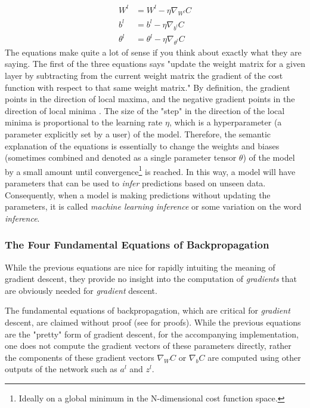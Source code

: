 \documentclass{article}
\begin{document}
\begin{align}
	W^{l}      & = W^{l} - \eta \nabla_{W^{l}}C           \\
	b^{l}      & = b^{l} - \eta \nabla_{b^{l}}C           \\
	\theta^{l} & = \theta^{l} - \eta \nabla_{\theta^{l}}C
\end{align}
The equations make quite a lot of sense if you think about exactly
what they are saying. The first of the three equations says "update the
weight matrix for a given layer by subtracting from the current weight matrix
the gradient of the cost function with respect to that same weight matrix." By definition,
the gradient points in the direction of local maxima, and the
negative gradient points in the direction of local minima \cite{MathLibreGradient2021}.
The size of the "step" in the direction of the local minima
is proportional to the learning rate $\eta$,
which is a hyperparameter (a parameter explicitly set by a user) of the model.
Therefore, the semantic explanation of the equations is essentially to change the
weights and biases (sometimes combined and denoted as a single parameter tensor $\theta$)
of the model by a small amount until convergence\footnote{Ideally
	on a global minimum in the N-dimensional cost function space.} is reached. In this way, a model
will have parameters that can be used to \textit{infer} predictions based on
unseen data. Consequently, when a model is making predictions without
updating the parameters, it is called \textit{machine learning inference} or
some variation on the word \textit{inference}.

\subsubsection{The Four Fundamental Equations of Backpropagation}

While the previous equations are nice for rapidly intuiting the meaning of
gradient descent, they provide no insight into the computation of \textit{gradients}
that are obviously needed for \textit{gradient} descent.

The fundamental equations of backpropagation, which are critical for \textit{gradient}
descent, are claimed without proof (see \cite{Nielsen2015} for proofs). While
the previous equations are the "pretty" form of gradient descent, for the
accompanying implementation, one does not compute the gradient vectors of these parameters
directly, rather the components of these gradient vectors $\nabla_{W}C$ or $\nabla_{b}C$
are computed using other outputs of the network such as $a^{l}$ and $z^{l}$.
\end{document}
